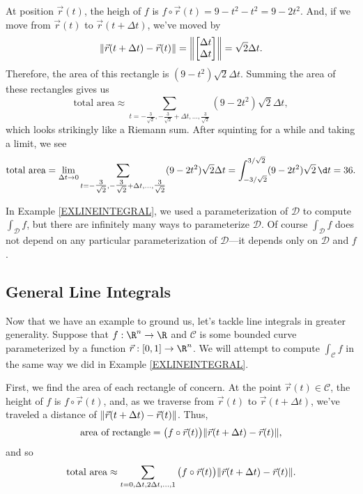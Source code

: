 \begin{example}
\begin{center}
	\end{center}
	
	At position
	$\vec r(t)$, the heigh of $f$ is $f\circ \vec r(t) = 9-t^2-t^2=9-2t^2$.
	And, if we move from $\vec r(t)$ to $\vec r(t+\Delta t)$, we've moved
	by
	\[
		\norm{\vec r(t+\Delta t) -\vec r(t)} = \norm*{\mat{\Delta t\\\Delta t}}
		=\sqrt{2}\Delta t.
	\]
	Therefore, the area of this rectangle is $(9-t^2)\sqrt{2} \Delta t$. 
	Summing the area of these rectangles gives us
	\[
		\text{total area} \approx \sum_{t=-\tfrac{3}{\sqrt{2}}, -\tfrac{3}{\sqrt{2}}+\Delta t,
		\ldots, \tfrac{3}{\sqrt{2}}} (9-2t^2)\sqrt{2} \Delta t,
	\]
	which looks strikingly like a Riemann sum.  After squinting for a while and
	taking a limit, we see
	\[
		\text{total area} =\lim_{\Delta t\to 0} \sum_{t=-\tfrac{3}{\sqrt{2}}, -\tfrac{3}{\sqrt{2}}+\Delta t,
		\ldots, \tfrac{3}{\sqrt{2}}} (9-2t^2)\sqrt{2} \Delta t
		= \int_{-3/\sqrt{2}}^{3/\sqrt{2}} (9-2t^2)\sqrt{2}\,\d t = 36.
	\]
\end{example}

In Example \ref{EXLINEINTEGRAL}, we used a parameterization of $\mathcal D$ to
compute $\int_{\mathcal D} f$, but there are infinitely many ways
to parameterize $\mathcal D$.  Of course $\int_{\mathcal D} f$ does not depend
on any particular parameterization of $\mathcal D$---it depends only on $\mathcal D$
and $f$.


\subsection{General Line Integrals}
Now that we have an example to ground us, let's tackle line integrals in greater
generality.  Suppose that $f:\R^n\to\R$ and $\mathcal C$ is some bounded curve
parameterized by a function $\vec r:[0,1]\to\R^n$.  We will attempt to compute
$\int_{\mathcal C} f$ in the same way we did in Example \ref{EXLINEINTEGRAL}.

First, we find the area of each rectangle of concern.  At the point $\vec r(t)\in\mathcal C$,
the height of $f$ is $f\circ \vec r(t)$, and, as we traverse from $\vec r(t)$
to $\vec r(t+\Delta t)$, we've traveled a distance of $\lVert\vec r(t+\Delta t)-\vec r(t)\rVert$.
Thus, 
\[
	\text{area of rectangle} = \big(f\circ \vec r(t)\big)\lVert\vec r(t+\Delta t)-\vec r(t)\rVert,
\]
and so
\begin{equation}
	\label{EQLINEREIMANN}
	\text{total area} \approx \sum_{t=0,\Delta t, 2\Delta t, \ldots, 1}\big(f\circ \vec r(t)\big)\lVert\vec r(t+\Delta t)-\vec r(t)\rVert.
\end{equation}

